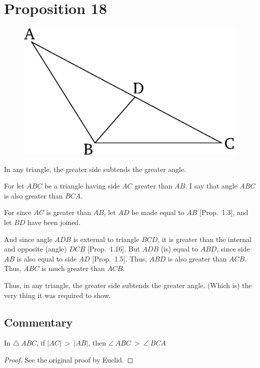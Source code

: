 \chapter*{Proposition 18}
\label{prop:18}

\begin{figure}[ht]
    \begin{center}
    \includegraphics[width=0.5\linewidth]{figures/fig18e.eps}
    \label{fig:prop_18}
    \end{center}
\end{figure}

In any triangle, the greater side subtends the greater angle.

For let $ABC$ be a triangle having side $AC$ greater than $AB$. I say that
angle $ABC$ is also greater than $BCA$.

For since $AC$ is greater than $AB$, let $AD$ be made equal to $AB$
 [Prop.~1.3],
and let $BD$ have been joined.

And since angle $ADB$ is external to triangle $BCD$, it is greater than the
internal and opposite (angle) $DCB$ [Prop.~1.16]. But $ADB$ (is) equal to $ABD$,
since side $AB$ is also equal to side $AD$ [Prop.~1.5]. Thus,
$ABD$ is also greater than $ACB$. Thus, $ABC$ is much greater than 
$ACB$.

Thus, in any triangle, the greater side subtends the greater angle.
(Which is) the very thing  it was required to show.


\section*{Commentary}

\begin{proposition}\label{proposition_18}\leanok
    In $\triangle~ABC$, if $|AC|~>~|AB|$, then $\angle~ABC~>~\angle~BCA$
\end{proposition}
\begin{proof}
    \leanok
    See the original proof by Euclid.
\end{proof}
